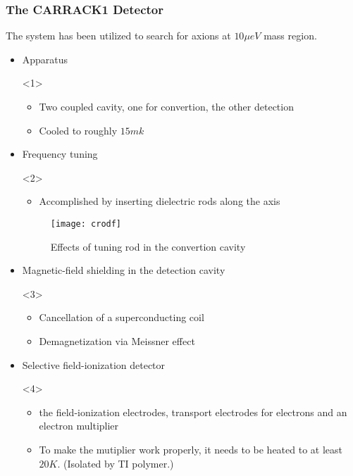 \documentclass{beamer}
\begin{document}
\begin{frame}
  \frametitle{The CARRACK1 Detector}
  The system has been utilized to search for axions at $10\mu eV$ mass region.
  \begin{itemize}
  \item<1-> Apparatus
    \begin{onlyenv}<1>
      \begin{itemize}
      \item Two coupled cavity, one for convertion, the other detection
      \item Cooled to roughly $15mk$
      \end{itemize}
    \end{onlyenv}
  \item<2-> Frequency tuning
    \begin{onlyenv}<2>
      \begin{itemize}
      \item Accomplished by inserting dielectric rods along the axis
      \end{itemize}
      \begin{figure}
        \centering
        \texttt{[image: crodf]}
        \caption{Effects of tuning rod in the convertion cavity}
      \end{figure}
     \end{onlyenv}
   \item<3-> Magnetic-field shielding in the detection cavity
     \begin{onlyenv}<3>
       \begin{itemize}
       \item Cancellation of a superconducting coil
       \item Demagnetization via Meissner effect
       \end{itemize}
     \end{onlyenv}
   \item<4-> Selective field-ionization detector
     \begin{onlyenv}<4>
       \begin{itemize}
       \item the field-ionization electrodes, transport electrodes for
         electrons and an electron multiplier
       \item To make the mutiplier work properly, it needs to be heated to at
         least $20K$. (Isolated by TI polymer.)
       \end{itemize}
     \end{onlyenv}
  \end{itemize}
\end{frame}
\end{document}
